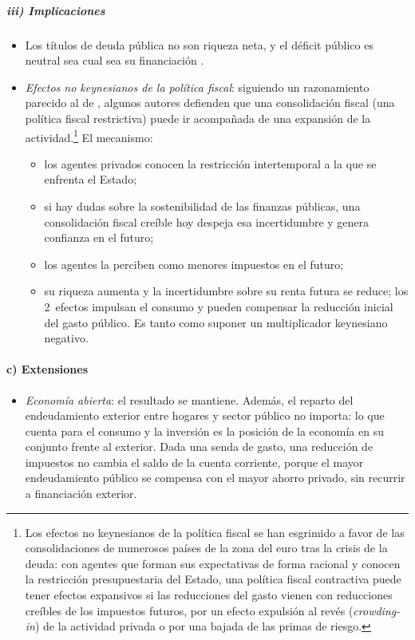 \documentclass[11pt]{article}
\begin{document}
\subparagraph{iii) Implicaciones}

\begin{itemize}
\item Los títulos de deuda pública no son riqueza neta, y el déficit público es neutral sea cual sea su financiación .
\item \emph{Efectos no keynesianos de la política fiscal}: siguiendo un razonamiento parecido al de , algunos autores defienden que una consolidación fiscal (una política fiscal restrictiva) puede ir acompañada de una expansión de la actividad\nocite{GiavazziPagano1990}.\footnote{Los efectos no keynesianos de la política fiscal se han esgrimido a favor de las consolidaciones de numerosos países de la zona del euro tras la crisis de la deuda: con agentes que forman sus expectativas de forma racional y conocen la restricción presupuestaria del Estado, una política fiscal contractiva puede tener efectos expansivos si las reducciones del gasto vienen con reducciones creíbles de los impuestos futuros, por un efecto expulsión al revés (\emph{crowding-in}) de la actividad privada o por una bajada de las primas de riesgo.} El mecanismo:
  \begin{itemize}
  \item los agentes privados conocen la restricción intertemporal a la que se enfrenta el Estado;
  \item si hay dudas sobre la sostenibilidad de las finanzas públicas, una consolidación fiscal creíble hoy despeja esa incertidumbre y genera confianza en el futuro;
  \item los agentes la perciben como menores impuestos en el futuro;
  \item su riqueza aumenta y la incertidumbre sobre su renta futura se reduce; los 2~efectos impulsan el consumo y pueden compensar la reducción inicial del gasto público. Es tanto como suponer un multiplicador keynesiano negativo.
  \end{itemize}
\end{itemize}

\paragraph{c) Extensiones}

\begin{itemize}
\item \emph{Economía abierta}: el resultado se mantiene. Además, el reparto del endeudamiento exterior entre hogares y sector público no importa: lo que cuenta para el consumo y la inversión es la posición de la economía en su conjunto frente al exterior. Dada una senda de gasto, una reducción de impuestos no cambia el saldo de la cuenta corriente, porque el mayor endeudamiento público se compensa con el mayor ahorro privado, sin recurrir a financiación exterior\nocite{UribeSchmittGrohe2017Open}.
\end{itemize}
\end{document}
